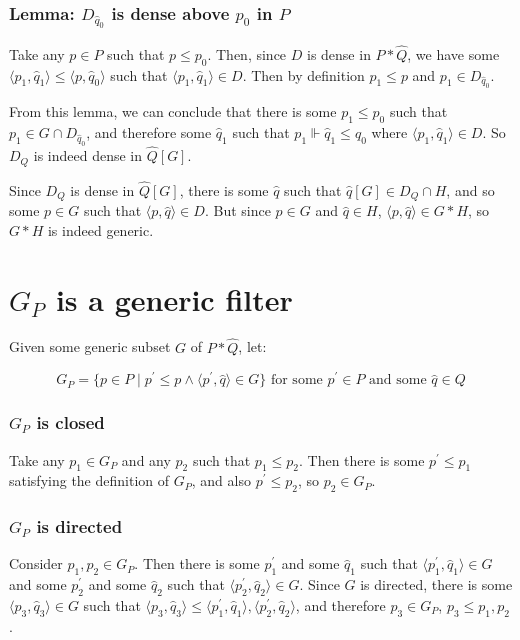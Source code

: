 \documentclass[12pt]{article}
\begin{document}
\subsubsection*{Lemma: $D_{\hat{q}_0}$ is dense above $p_0$ in $P$}

Take any $p\in P$ such that $p\leq p_0$.  Then, since $D$ is dense in $P*\hat{Q}$, we have some $\langle p_1,\hat{q}_1\rangle\leq \langle p,\hat{q}_0\rangle$ such that $\langle p_1,\hat{q}_1\rangle\in D$.  Then by definition $p_1\leq p$ and $p_1\in D_{\hat{q}_0}$.

\bigskip{}
From this lemma, we can conclude that there is some $p_1\leq p_0$ such that $p_1\in G\cap D_{\hat{q}_0}$, and therefore some $\hat{q}_1$ such that $p_1\Vdash \hat{q}_1\leq\hat{q}_0$ where $\langle p_1,\hat{q}_1\rangle\in D$.  So $D_Q$ is indeed dense in $\hat{Q}[G]$.

\bigskip{}
Since $D_Q$ is dense in $\hat{Q}[G]$, there is some $\hat{q}$ such that $\hat{q}[G]\in D_Q\cap H$, and so some $p\in G$ such that $\langle p,\hat{q}\rangle\in D$.  But since $p\in G$ and $\hat{q}\in H$, $\langle p,\hat{q}\rangle\in G*H$, so $G*H$ is indeed generic.


\section*{$G_P$ is a generic filter}

Given some generic subset $G$ of $P*\hat{Q}$, let:

$$G_P=\{p\in P\mid p^\prime\leq p \wedge \langle p^\prime,\hat{q}\rangle\in G\} \text{ for some }p^\prime\in P\text{ and some }\hat{q}\in Q$$

\subsubsection*{$G_P$ is closed}

Take any $p_1\in G_P$ and any $p_2$ such that $p_1\leq p_2$.  Then there is some $p^\prime\leq p_1$ satisfying the definition of $G_P$, and also $p^\prime\leq p_2$, so $p_2\in G_P$.

\subsubsection*{$G_P$ is directed}

Consider $p_1,p_2\in G_P$.  Then there is some $p^\prime_1$ and some $\hat{q}_1$ such that $\langle p^\prime_1,\hat{q}_1\rangle\in G$ and some $p^\prime_2$ and some $\hat{q}_2$ such that $\langle p^\prime_2,\hat{q}_2\rangle\in G$.  Since $G$ is directed, there is some $\langle p_3,\hat{q}_3\rangle\in G$ such that $\langle p_3,\hat{q}_3\rangle\leq \langle p^\prime_1,\hat{q}_1\rangle,\langle p^\prime_2,\hat{q}_2\rangle$, and therefore $p_3\in G_P$, $p_3\leq p_1,p_2$.
\end{document}
